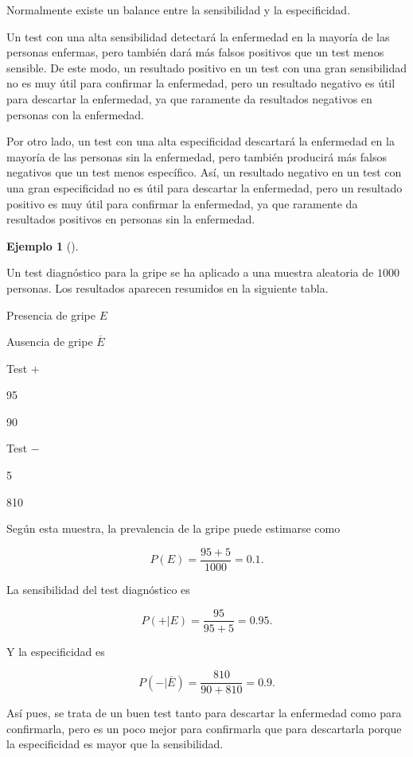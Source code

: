 \documentclass[
  spanish,
  a4paper,
]{scrreport}
\theoremstyle{plain}
\theoremstyle{definition}
\newtheorem{example}{Ejemplo}[chapter]
\theoremstyle{definition}
\theoremstyle{remark}
\begin{document}
Normalmente existe un balance entre la sensibilidad y la especificidad.

Un test con una alta sensibilidad detectará la enfermedad en la mayoría
de las personas enfermas, pero también dará más falsos positivos que un
test menos sensible. De este modo, un resultado positivo en un test con
una gran sensibilidad no es muy útil para confirmar la enfermedad, pero
un resultado negativo es útil para descartar la enfermedad, ya que
raramente da resultados negativos en personas con la enfermedad.

Por otro lado, un test con una alta especificidad descartará la
enfermedad en la mayoría de las personas sin la enfermedad, pero también
producirá más falsos negativos que un test menos específico. Así, un
resultado negativo en un test con una gran especificidad no es útil para
descartar la enfermedad, pero un resultado positivo es muy útil para
confirmar la enfermedad, ya que raramente da resultados positivos en
personas sin la enfermedad.

\begin{example}[]\protect\hypertarget{exm-sensibilidad-especificidad}{}\label{exm-sensibilidad-especificidad}

Un test diagnóstico para la gripe se ha aplicado a una muestra aleatoria
de \(1000\) personas. Los resultados aparecen resumidos en la siguiente
tabla.

Presencia de gripe \(E\)

Ausencia de gripe \(\overline E\)

Test \(+\)

95

90

Test \(−\)

5

810

Según esta muestra, la prevalencia de la gripe puede estimarse como

\[P(E) = \frac{95+5}{1000} = 0.1.\]

La sensibilidad del test diagnóstico es

\[P(+|E) = \frac{95}{95+5}= 0.95.\]

Y la especificidad es

\[P(-|\overline{E}) = \frac{810}{90+810}=0.9.\]

Así pues, se trata de un buen test tanto para descartar la enfermedad
como para confirmarla, pero es un poco mejor para confirmarla que para
descartarla porque la especificidad es mayor que la sensibilidad.

\end{example}
\end{document}

